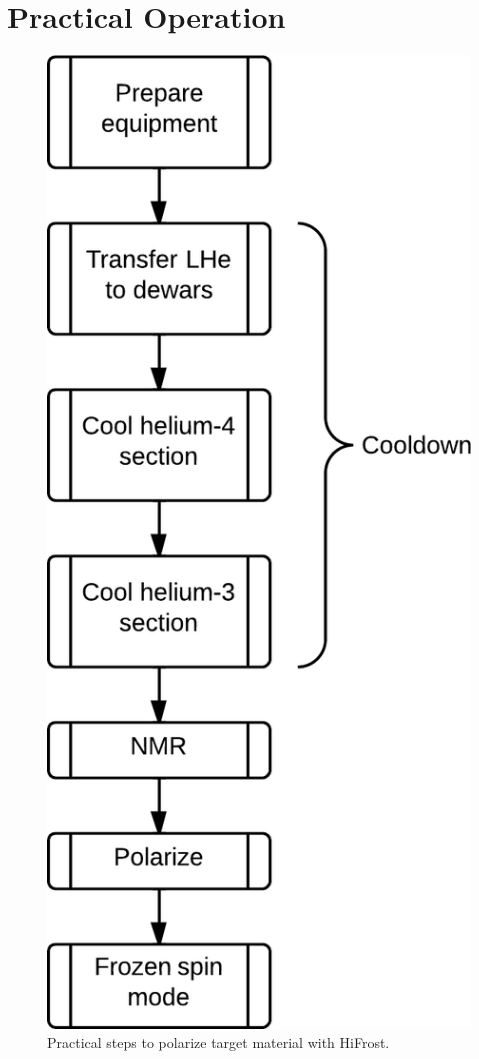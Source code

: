 \chapter{Practical Operation} 
\begin{figure}[!h]
 \centering
 \includegraphics[scale=.24]{./img/cooldown-overview-flowchart.png}
 \caption{Practical steps to polarize target material with HiFrost.}
 \label{fig:cooldown-overview-flowchart}
\end{figure}


